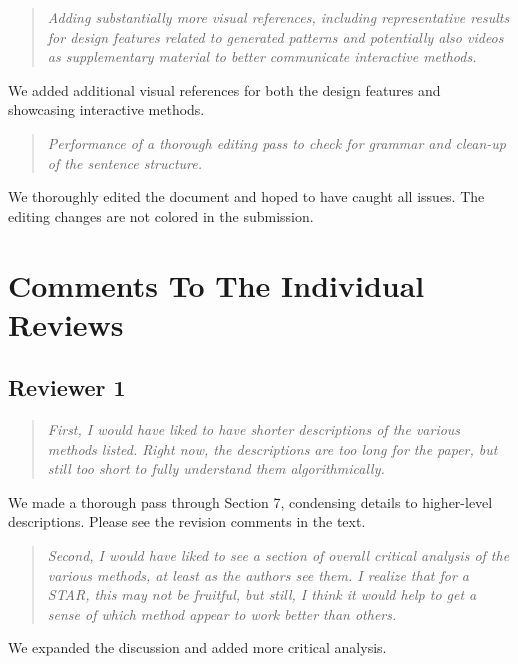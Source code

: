 \documentclass{egpubl}
\newcommand{\rev}[2]{{\color{greenrev}\textsuperscript{#1}#2}}
\renewcommand{\rev}[2]{{#2}}
\begin{document}
\begin{quote}
\emph{
    Adding substantially more visual references, including representative results for design features related to generated patterns and potentially also videos as supplementary material to better communicate interactive methods.
    }
\end{quote}


\rev{}{We added additional visual references for both the design features and showcasing interactive methods.}

\begin{quote}
\emph{
    Performance of a thorough editing pass to check for grammar and clean-up of the sentence structure.
    }
\end{quote}


\rev{}{We thoroughly edited the document and hoped to have caught all issues. The editing changes are not colored in the submission.}


\section*{Comments To The Individual Reviews}

\subsection*{Reviewer 1} 

\begin{quote}
\emph{First, I would have liked to have shorter descriptions of the various methods listed. Right now, the descriptions are too long for the paper, but still too short to fully understand them algorithmically.}
\end{quote}

\rev{}{We made a thorough pass through Section 7, condensing details to higher-level descriptions. Please see the revision comments in the text.}


\begin{quote}
\emph{Second, I would have liked to see a section of overall critical analysis of the various methods, at least as the authors see them. I realize that for a STAR, this may not be fruitful, but still, I think it would help to get a sense of which method appear to work better than others.}
\end{quote}


\rev{}{We expanded the discussion and added more critical analysis.}
\end{document}

